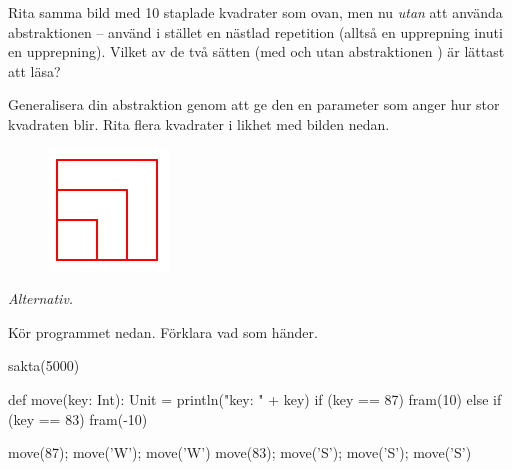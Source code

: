 \Subtask Rita samma bild med 10 staplade kvadrater som ovan, men nu \emph{utan} att använda abstraktionen  -- använd i stället en nästlad repetition (alltså en upprepning inuti en upprepning). Vilket av de två sätten (med och utan abstraktionen ) är lättast att läsa? %

\Subtask Generalisera din abstraktion  genom att ge den en parameter  som anger hur stor kvadraten blir. Rita flera kvadrater i likhet med bilden nedan.

\begin{figure}[H]
\includegraphics{../img/kojo/square-param}
\end{figure}













\Task \emph{Alternativ.} \label{kojo:alt}

\Subtask Kör programmet nedan. Förklara vad som händer. %

\begin{Code}
sakta(5000)

def move(key: Int): Unit = {
  println("key: " + key)
  if (key == 87) fram(10)
  else if (key == 83) fram(-10)
}

move(87); move('W'); move('W')
move(83); move('S'); move('S'); move('S')
\end{Code}

